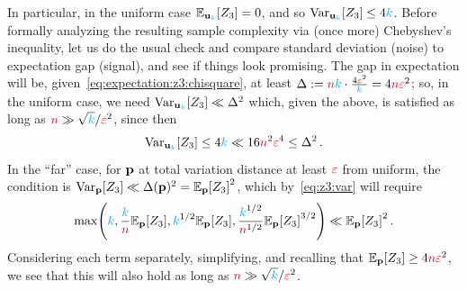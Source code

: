 In particular, in the uniform case $\bE{\uniform_\ab}{Z_3} = 0$, and so $\operatorname{Var}_{\mathbf{u}_{\textcolor{cyan}{k}}}[Z_3] \leq 4{\textcolor{cyan}{k}}$. Before formally analyzing the resulting sample complexity via (once more) Chebyshev's inequality, let us do the usual check and compare standard deviation (noise) to expectation gap (signal), and see if things look promising. The gap in expectation will be, given~\cref{eq:expectation:z3:chisquare}, at least $\Delta := {\textcolor{purple}{n}}{\textcolor{cyan}{k}} \cdot \frac{4\textcolor{red}{\varepsilon}^2}{{\textcolor{cyan}{k}}} = 4{\textcolor{purple}{n}}\textcolor{red}{\varepsilon}^2$; so, in the uniform case, we need
$\operatorname{Var}_{\mathbf{u}_{\textcolor{cyan}{k}}}[Z_3] \ll \Delta^2$ which, given the above, is satisfied as long as ${\textcolor{purple}{n}} \gg \sqrt{{\textcolor{cyan}{k}}}/{\textcolor{red}{\varepsilon}^2}$, since then
\[
    \operatorname{Var}_{\mathbf{u}_{\textcolor{cyan}{k}}}[Z_3] \leq 4{\textcolor{cyan}{k}} \ll 16{\textcolor{purple}{n}}^2\textcolor{red}{\varepsilon}^4 \leq \Delta^2\,.
\]
In the ``far'' case, for $\mathbf{p}$ at total variation distance at least $\textcolor{red}{\varepsilon}$ from uniform, the condition is $\Var_\p[Z_3] \ll \Delta(\p)^2 = \bE{\p}{Z_3}^2$, which by~\cref{eq:z3:var} will require
\[
    \max\Paren{\ab, \frac{\ab}{\ns}\bE{\p}{Z_3}, \ab^{1/2}\bE{\p}{Z_3} , \frac{\ab^{1/2}}{\ns^{1/2}}\bE{\p}{Z_3}^{3/2} } \ll \bE{\p}{Z_3}^2\,.
\]
Considering each term separately, simplifying, and recalling that $\bE{\p}{Z_3} \geq 4\ns\dst^2$, we see that this will also hold as long as ${\textcolor{purple}{n}} \gg \sqrt{{\textcolor{cyan}{k}}}/{\textcolor{red}{\varepsilon}^2}$.

